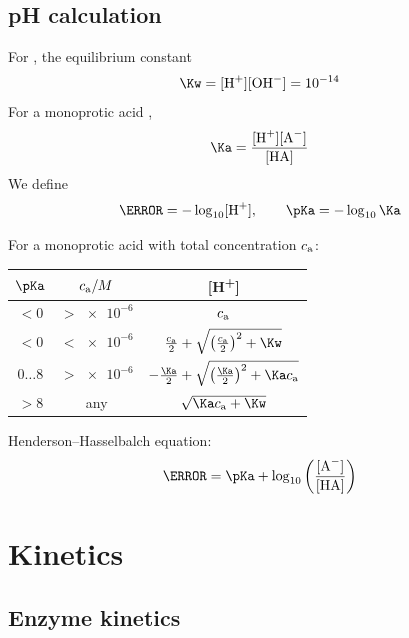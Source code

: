 \documentclass[11pt,a4paper,twoside]{article}
\numberwithin{equation}{section}
\newcommand{\ca}{\ensuremath{c_{\rm a}}}
\begin{document}
\subsection{pH calculation}

For , the equilibrium constant
\begin{equation}
    \Kw = [\ce{H+}][\ce{OH-}] = \num{e-14}
\end{equation}
For a monoprotic acid ,
\begin{equation}
    \Ka = \frac{[\ce{H+}][\ce{A-}]}{[\ce{HA}]}
\end{equation}
We define
\begin{equation}
    \pH = -\log_{10} [\ce{H+}], \qquad
    \pKa = -\log_{10} \Ka
\end{equation}

For a monoprotic acid with total concentration $\ca$:
\renewcommand{\arraystretch}{1.5}
\begin{center}
    \begin{tabularx}{0.675\textwidth}{|c|c|C|}
        \hline
        $\pKa$ & $ \ca / M $ & [H\textsuperscript{+}] \\
        \hline
        $ {} < 0$ & $ {} > \num{e-6}$ & $\ca$ \\
        $ {} < 0$ & $ {} < \num{e-6}$ & $\frac{\ca}{2} + \sqrt{\qty(\frac{\ca}{2})^2 + \Kw}$ \\
        $0 \ldots 8$ & $ {} > \num{e-6} $ & 
        $ -\frac{\Ka}{2} + \sqrt{\qty(
            \frac{\Ka}{2}
        )^2 + \Ka \ca} $ \\
        ${} > 8$ & any & $\sqrt{\Ka \ca + \Kw}$ \\
        \hline
    \end{tabularx}
    \end{center}

Henderson--Hasselbalch equation:
\begin{equation}
    \pH = \pKa + \log_{10} \qty( \frac{[\ce{A-}]}{[\ce{HA}]} )
\end{equation}

\section{Kinetics}

\subsection{Enzyme kinetics}
\end{document}
